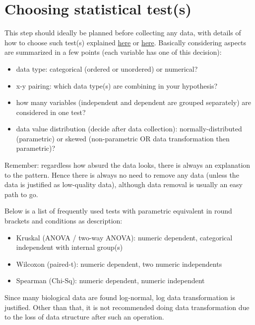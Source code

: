 \documentclass[../note.tex]{subfiles} %
\begin{document}
\section{Choosing statistical test(s)}
This step should ideally be planned before collecting any data, with details of how to choose such test(s) explained \href{https://www.dataanalytics.org.uk/data-analytics-knowledge-base-tips-tricks-r-excel/statistics-guide/which-statistics-test/}{here} or \href{http://stats.idre.ucla.edu/other/mult-pkg/whatstat/}{here}.  Basically considering aspects are summarized in a few points (each variable has one of this decision):
\begin{itemize}
    \item data type: categorical (ordered or unordered) or numerical?
    \item x-y pairing: which data type(s) are combining in your hypothesis?
    \item how many variables (independent and dependent are grouped separately) are considered in one test?
    \item data value distribution (decide after data collection): normally-distributed (parametric) or skewed (non-parametric OR data transformation then parametric)?
\end{itemize}

Remember: regardless how absurd the data looks, there is always an explanation to the pattern.  Hence there is always no need to remove any data (unless the data is justified as low-quality data), although data removal is usually an easy path to go.

Below is a list of frequently used tests with parametric equivalent in round brackets and conditions as description:
\begin{itemize}
    \item Kruskal (ANOVA / two-way ANOVA): numeric dependent, categorical independent with internal group(s)
    \item Wilcoxon (paired-t): numeric dependent, two numeric independents
    \item Spearman (Chi-Sq): numeric dependent, numeric independent
\end{itemize}

Since many biological data are found log-normal, log data transformation is justified.  Other than that, it is not recommended doing data transformation due to the loss of data structure after such an operation.
\end{document}
